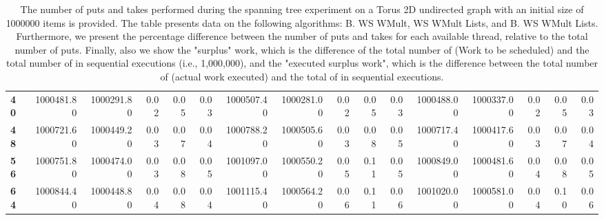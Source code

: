\begin{table}[!ht]
{\begin{tabular}{lrrrrrrrrrrrrrrr}
\textbf{40} &  1000481.80 & 1000291.80 &           0.02 &        0.05 &                 0.03 &     1000507.40 & 1000281.00 &           0.02 &        0.05 &                 0.03 &        1000488.00 & 1000337.00 &           0.02 &        0.05 &                 0.03 \\
\textbf{48} &  1000721.60 & 1000449.20 &           0.03 &        0.07 &                 0.04 &     1000788.20 & 1000505.60 &           0.03 &        0.08 &                 0.05 &        1000717.40 & 1000417.60 &           0.03 &        0.07 &                 0.04 \\
\textbf{56} &  1000751.80 & 1000474.00 &           0.03 &        0.08 &                 0.05 &     1001097.00 & 1000550.20 &           0.05 &        0.11 &                 0.05 &        1000849.00 & 1000481.60 &           0.04 &        0.08 &                 0.05 \\
\textbf{64} &  1000844.40 & 1000448.80 &           0.04 &        0.08 &                 0.04 &     1001115.40 & 1000564.20 &           0.06 &        0.11 &                 0.06 &        1001020.00 & 1000581.00 &           0.04 &        0.10 &                 0.06 \\
\bottomrule
\end{tabular}}
\label{difference-Torus_2D_undirected-1000000-B_WS_NC_MULT_OPT-WS_NC_MULT_LA_OPT-B_WS_NC_MULT_LA_OPT}
\caption{The number of puts and takes performed during the
    spanning tree experiment on a Torus 2D undirected graph with an initial size
    of 1000000 items is provided. The table presents data on the
    following algorithms: B. WS WMult, WS WMult Lists, and
    B. WS WMult Lists. Furthermore, we present the percentage difference
    between the number of puts and takes for each available thread,
    relative to the total number of puts. Finally, also we show the
    "surplus" work, which is the difference of the total number of
    \Puts (Work to be scheduled) and the total number of \Puts in
    sequential executions (i.e., 1,000,000), and the "executed surplus
    work", which is the difference between the total number of \Takes
    (actual work executed) and the total of \Takes in sequential
    executions.}
\end{table}
